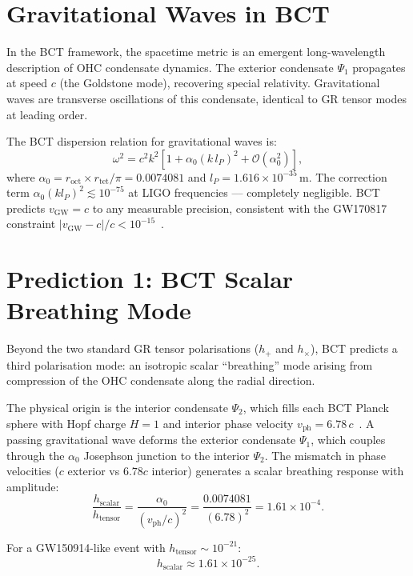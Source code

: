 \documentclass[aps,prl,twocolumn,superscriptaddress,showpacs]{revtex4-2}
\begin{document}
\section{Gravitational Waves in BCT}

In the BCT framework, the spacetime metric is an emergent 
long-wavelength description of OHC condensate dynamics. 
The exterior condensate $\Psi_1$ propagates at speed $c$ 
(the Goldstone mode), recovering special relativity. 
Gravitational waves are transverse oscillations of this 
condensate, identical to GR tensor modes at leading order.

The BCT dispersion relation for gravitational waves is:
\begin{equation}
\omega^2 = c^2 k^2 \left[1 + \alpha_0 (k\,l_P)^2 + 
\mathcal{O}(\alpha_0^2)\right],
\end{equation}
where $\alpha_0 = r_\mathrm{oct}\times r_\mathrm{tet}/\pi = 
0.0074081$ and $l_P = 1.616\times10^{-35}$\,m. The correction 
term $\alpha_0(kl_P)^2 \lesssim 10^{-75}$ at LIGO frequencies 
--- completely negligible. BCT predicts $v_\mathrm{GW} = c$ 
to any measurable precision, consistent with the GW170817 
constraint $|v_\mathrm{GW}-c|/c < 10^{-15}$~\cite{GW170817}.

\section{Prediction 1: BCT Scalar Breathing Mode}

Beyond the two standard GR tensor polarisations ($h_+$ and 
$h_\times$), BCT predicts a third polarisation mode: an 
isotropic scalar ``breathing'' mode arising from compression 
of the OHC condensate along the radial direction.

The physical origin is the interior condensate $\Psi_2$, which 
fills each BCT Planck sphere with Hopf charge $H=1$ and interior 
phase velocity $v_\mathrm{ph} = 6.78\,c$~\cite{BCT_AppJH}. 
A passing gravitational wave deforms the exterior condensate 
$\Psi_1$, which couples through the $\alpha_0$ Josephson junction 
to the interior $\Psi_2$. The mismatch in phase velocities 
($c$ exterior vs $6.78c$ interior) generates a scalar 
breathing response with amplitude:
\begin{equation}
\frac{h_\mathrm{scalar}}{h_\mathrm{tensor}} = 
\frac{\alpha_0}{(v_\mathrm{ph}/c)^2} = 
\frac{0.0074081}{(6.78)^2} = 1.61\times10^{-4}.
\end{equation}

For a GW150914-like event with $h_\mathrm{tensor}\sim10^{-21}$:
\begin{equation}
h_\mathrm{scalar} \approx 1.61\times10^{-25}.
\end{equation}
\end{document}
